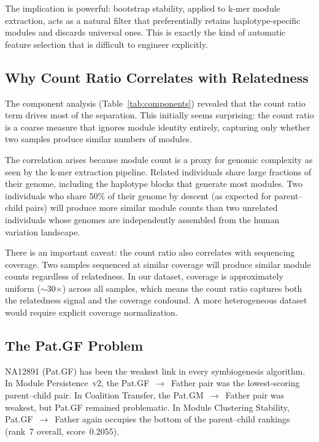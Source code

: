 \documentclass{../yalumba}
\begin{document}
The implication is powerful: bootstrap stability, applied to k-mer module
extraction, acts as a natural filter that preferentially retains
haplotype-specific modules and discards universal ones.  This is exactly the
kind of automatic feature selection that is difficult to engineer explicitly.

\subsection{Why Count Ratio Correlates with Relatedness}

The component analysis (Table~\ref{tab:components}) revealed that the count
ratio term drives most of the separation.  This initially seems surprising:
the count ratio is a coarse measure that ignores module identity entirely,
capturing only whether two samples produce similar numbers of modules.

The correlation arises because module count is a proxy for genomic complexity
as seen by the k-mer extraction pipeline.  Related individuals share large
fractions of their genome, including the haplotype blocks that generate most
modules.  Two individuals who share 50\% of their genome by descent (as
expected for parent--child pairs) will produce more similar module counts than
two unrelated individuals whose genomes are independently assembled from the
human variation landscape.


There is an important caveat: the count ratio also correlates with sequencing
coverage.  Two samples sequenced at similar coverage will produce similar
module counts regardless of relatedness.  In our dataset, coverage is
approximately uniform ($\sim$30$\times$) across all samples, which means the
count ratio captures both the relatedness signal and the coverage confound.
A more heterogeneous dataset would require explicit coverage normalization.

\subsection{The Pat.GF Problem}

NA12891 (Pat.GF) has been the weakest link in every symbiogenesis algorithm.
In Module Persistence~v2, the Pat.GF~$\to$~Father pair was the
lowest-scoring parent--child pair.  In Coalition Transfer, the
Pat.GM~$\to$~Father pair was weakest, but Pat.GF remained problematic.  In
Module Clustering Stability, Pat.GF~$\to$~Father again occupies the bottom
of the parent--child rankings (rank~7 overall, score~0.2055).
\end{document}
